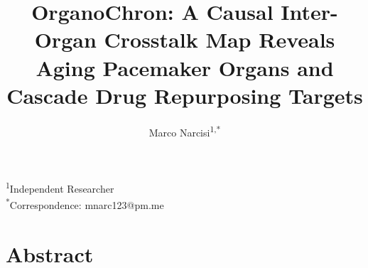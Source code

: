 \documentclass[11pt,a4paper]{article}
\begin{document}
\title{OrganoChron: A Causal Inter-Organ Crosstalk Map Reveals Aging Pacemaker Organs and Cascade Drug Repurposing Targets}

\author{
Marco Narcisi\textsuperscript{1,*}
}

\date{}

\maketitle

\noindent\textsuperscript{1}Independent Researcher\\
\textsuperscript{*}Correspondence: mnarc123@pm.me

\section*{Abstract}
\end{document}

